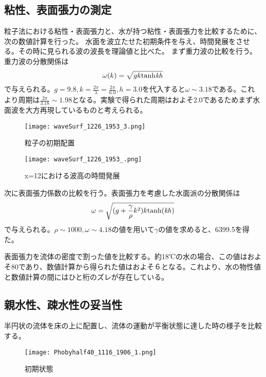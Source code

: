 \documentclass[]{jsarticle}
\begin{document}
\subsection{粘性、表面張力の測定}
粒子法における粘性・表面張力と、水が持つ粘性・表面張力を比較するために、次の数値計算を行った。
水面を波立たせた初期条件を与え、時間発展をさせる。その時に見られる波の波長を理論値と比べた。
まず重力波の比較を行う。重力波の分散関係は
\begin{equation}
  \omega(k)=\sqrt{gk\rm{tanh}\it{kh}}
\end{equation}
で与えられる\cite{tatsumiKiso}。$g=9.8, k=\frac{2\pi}{\lambda}=\frac{2\pi}{6.0}, h=3.0$を代入すると$\omega\sim3.18$である。これより周期は$\frac{2\pi}{3.18}\sim1.98$となる。実験で得られた周期はおよそ2.0であるためまず水面波を大方再現しているものと考えられる。
\begin{figure}[H]
  \centering
  \texttt{[image: waveSurf\_1226\_1953\_3.png]}
  \caption{粒子の初期配置}
  \label{fig:waveSurfInit}
\end{figure}
\begin{figure}[H]
  \centering
  \texttt{[image: waveSurf\_1226\_1953\_.png]}
  \caption{x=12における波高の時間発展}
  \label{fig:waveSurfEvol}
\end{figure}


次に表面張力係数の比較を行う。表面張力を考慮した水面派の分散関係は
\begin{equation}
\omega=\sqrt{(g+\frac{\gamma}{\rho}k^2)k\rm{tanh}(\it{kh})}
\end{equation}
で与えられる\cite{tatsumiKiso}。$\rho\sim1000, \omega\sim4.18$の値を用いて$\gamma$の値を求めると、6399.5を得た。

表面張力を流体の密度で割った値を比較する。約18℃の水の場合、この値はおよそ80であり、数値計算から得られた値はおよそ６となる。これより、水の物性値と数値計算の間にはひと桁のズレが存在している。


\subsection{親水性、疎水性の妥当性}


半円状の流体を床の上に配置し、流体の運動が平衡状態に達した時の様子を比較する。
\begin{figure}[H]
  \centering
  \texttt{[image: Phobyhalf40\_1116\_1906\_1.png]}
  \caption{初期状態}
  \label{fig:contactInitial}
\end{figure}
\end{document}
